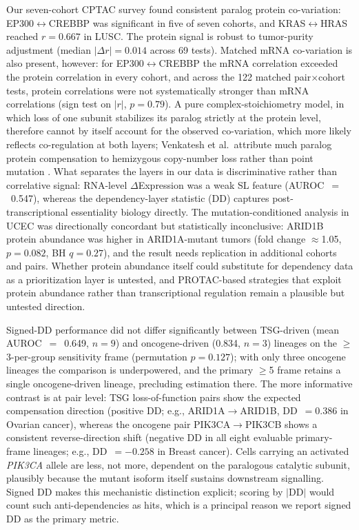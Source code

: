 \documentclass[11pt,a4paper]{article}
\begin{document}
Our seven-cohort CPTAC survey found consistent paralog protein co-variation: EP300$\leftrightarrow$CREBBP was significant in five of seven cohorts, and KRAS$\leftrightarrow$HRAS reached $r=0.667$ in LUSC. The protein signal is robust to tumor-purity adjustment (median $|\Delta r|=0.014$ across 69 tests). Matched mRNA co-variation is also present, however: for EP300$\leftrightarrow$CREBBP the mRNA correlation exceeded the protein correlation in every cohort, and across the 122 matched pair$\times$cohort tests, protein correlations were not systematically stronger than mRNA correlations (sign test on $|r|$, $p=0.79$). A pure complex-stoichiometry model, in which loss of one subunit stabilizes its paralog strictly at the protein level, therefore cannot by itself account for the observed co-variation, which more likely reflects co-regulation at both layers; Venkatesh et al.\ attribute much paralog protein compensation to hemizygous copy-number loss rather than point mutation \cite{Venkatesh2025}. What separates the layers in our data is discriminative rather than correlative signal: RNA-level $\Delta$Expression was a weak SL feature (AUROC~$=$~0.547), whereas the dependency-layer statistic (DD) captures post-transcriptional essentiality biology directly. The mutation-conditioned analysis in UCEC was directionally concordant but statistically inconclusive: ARID1B protein abundance was higher in ARID1A-mutant tumors (fold change $\approx$1.05, $p=0.082$, BH $q=0.27$), and the result needs replication in additional cohorts and pairs. Whether protein abundance itself could substitute for dependency data as a prioritization layer is untested, and PROTAC-based strategies that exploit protein abundance rather than transcriptional regulation remain a plausible but untested direction.

Signed-DD performance did not differ significantly between TSG-driven (mean AUROC~$=$~0.649, $n=9$) and oncogene-driven (0.834, $n=3$) lineages on the $\geq$3-per-group sensitivity frame (permutation $p=0.127$); with only three oncogene lineages the comparison is underpowered, and the primary $\geq$5 frame retains a single oncogene-driven lineage, precluding estimation there. The more informative contrast is at pair level: TSG loss-of-function pairs show the expected compensation direction (positive DD; e.g., ARID1A$\rightarrow$ARID1B, DD~$=0.386$ in Ovarian cancer), whereas the oncogene pair PIK3CA$\rightarrow$PIK3CB shows a consistent reverse-direction shift (negative DD in all eight evaluable primary-frame lineages; e.g., DD~$=-0.258$ in Breast cancer). Cells carrying an activated \textit{PIK3CA} allele are less, not more, dependent on the paralogous catalytic subunit, plausibly because the mutant isoform itself sustains downstream signalling. Signed DD makes this mechanistic distinction explicit; scoring by $|$DD$|$ would count such anti-dependencies as hits, which is a principal reason we report signed DD as the primary metric.
\end{document}
